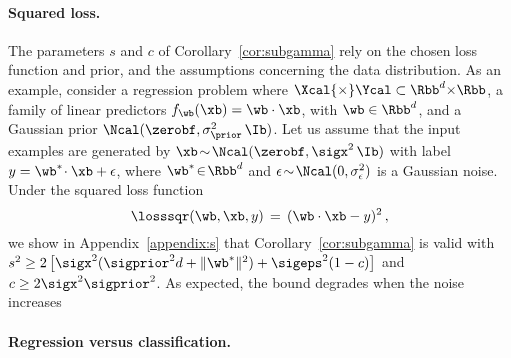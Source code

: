 \documentclass{article}
\theoremstyle{definition}
\theoremstyle{plain}
\begin{document}
\paragraph{Squared loss.}

The parameters $s$ and $c$ of Corollary~\ref{cor:subgamma} rely on the chosen loss function and prior, and the assumptions concerning the data distribution.
As an example, consider a regression problem where $\Xcal{\times}\Ycal \subset \Rbb^d{\times}\Rbb$, a family of linear predictors $f_\wb(\xb) = \wb\cdot\xb$, with $\wb\in\Rbb^d$, and a Gaussian prior 
%
$\Ncal(\zerobf, \sigma_\prior^2\,\Ib)$.  
%
Let us assume that the input examples are generated by $\xb\!\sim\!\Ncal(\zerobf,\sigx^2\,\Ib)$ with label $y=\wb^*\!\cdot \xb+\epsilon$, where $\wb^*\! \in\! \Rbb^d$ and  $\epsilon\!\sim\!\Ncal(0,\sigma_\epsilon^2)$ is a Gaussian noise.
Under the squared loss function
\begin{equation}\label{eq:sqrloss}
\losssqr(\wb,\xb,y) \, =\, (\wb\cdot\xb-y)^2\,,
\end{equation}
we show in Appendix~\ref{appendix:s} that Corollary~\ref{cor:subgamma}  is valid with 
 $s^2 \geq 2\left[\sigx^2(\sigprior^2d+ \|\wb^*\|^2)+ \sigeps^2(1- c)\right]$ and $c \geq 2\sigx^2\sigprior^2$.
As expected, the bound degrades when the noise increases
%
%
%


\paragraph{Regression versus classification.}
\label{section:discussion}
\end{document}

